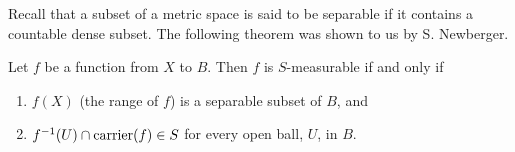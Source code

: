 Recall that a subset of a metric space is said to be separable if it contains a countable dense subset. The following theorem was shown to us by S. Newberger.

\begin{theorem}
\label{thm:characterization of meas func}
Let $f$ be a function from $X$ to $B$. Then $f$ is $S$-measurable if and only if
\begin{enumerate}[label=\arabic*),ref=\arabic*)]
    \item \label{thm:item:sep range} $f(X)$ (the range of $f$) is a separable subset of $B$, and
    \item \label{thm:item:car} $f^{-1}(U)\cap\operatorname{carrier}(f)\in S$ for every open ball, $U$, in $B$.
\end{enumerate}
\end{theorem}

